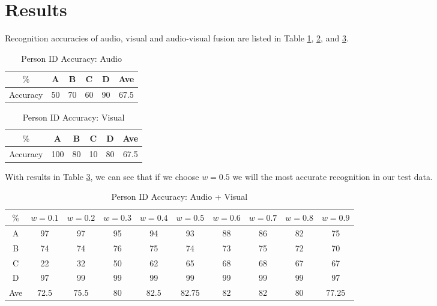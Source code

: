 \documentclass{article}
\begin{document}
	\section{Results}
	Recognition accuracies of audio, visual and audio-visual fusion are listed in Table \ref{tab:aud}, \ref{tab:img}, and \ref{tab:av}. 
	\begin{table}[H]
		\centering
		\caption{Person ID Accuracy: Audio}
		\label{tab:aud}
		\begin{tabular}{c|c|c|c|c|c|}
			\cline{2-6}
		$\%$	& A  & B  & C  & D  & Ave  \\ \hline
			\multicolumn{1}{|c|}{Accuracy} & 50 & 70 & 60 & 90 & 67.5 \\ \hline
		\end{tabular}
	\end{table}
\begin{table}[H]
	\centering
	\caption{Person ID Accuracy: Visual}
	\label{tab:img}
	\begin{tabular}{c|c|c|c|c|c|}
		\cline{2-6}
	$\%$	& A  & B  & C  & D  & Ave  \\ \hline
		\multicolumn{1}{|c|}{Accuracy} & 100 & 80 & 10 & 80 & 67.5 \\ \hline
	\end{tabular}
	
\end{table}
\justify With results in Table \ref{tab:av}, we can see that if we choose $w=0.5$ we will the most accurate recognition in our test data.
		
		\begin{table}[H]
			\centering
			\caption{Person ID Accuracy: Audio + Visual}
			\label{tab:av}
			\begin{tabular}{c|c|c|c|c|c|c|c|c|c|}
				\cline{2-10}
				$\%$                      & $w=0.1$ & $w=0.2$ & $w=0.3$ & $w=0.4$ & $w=0.5$ & $w=0.6$ & $w=0.7$ & $w=0.8$ & $w=0.9$ \\ \hline
				\multicolumn{1}{|c|}{A}   & 97      & 97      & 95      & 94      & 93      & 88      & 86      & 82      & 75      \\ \hline
				\multicolumn{1}{|c|}{B}   & 74      & 74      & 76      & 75      & 74      & 73      & 75      & 72      & 70      \\ \hline
				\multicolumn{1}{|c|}{C}   & 22      & 32      & 50      & 62      & 65      & 68      & 68      & 67      & 67      \\ \hline
				\multicolumn{1}{|c|}{D}   & 97      & 99      & 99      & 99      & 99      & 99      & 99      & 99      & 97      \\ \hline
				\multicolumn{1}{|c|}{Ave} & 72.5    & 75.5    & 80      & 82.5    & 82.75   & 82      & 82      & 80      & 77.25   \\ \hline
			\end{tabular}
		\end{table}
\end{document}
